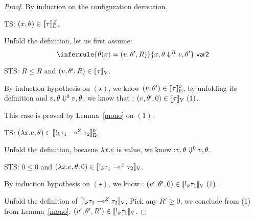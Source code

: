 \begin{proof}
  By induction on the configuration derivation.\\
   

  TS: $(x, \env) \in  \lre{}{\nnatA}{ \type}$.
  
  Unfold the definition, let us first assume: \[   \inferrule{  \env(x)  =  (\valr, \env',  \adapt)  }{x,
      \env  \bigstep{\adapt} \valr, \env' }~\textsf{var2}  \]
  
  STS: $R \leq R $  and $ (\valr, \env', R  ) \in \lrv{\type} $.

  By induction hypothesis on $(\star)$, we know $ (\valr, \env') \in \lre{}{0}{\type} $, by unfolding its definition and $ \valr, \env \bigstep{0} \valr, \env $,  we know that : $ (\valr, \env' ,0) \in \lrv{\type}~(1)$.

  This case is proved by Lemma~\ref{mono} on $(1)$.\\


   TS: $(\lambda x. \expr , \env) \in  \lre{}{0}{  \bang{\idx} \type_1\lto{\nnatA} \type_2 }$.
  
  Unfold the definition, becasue $\lambda x. \expr$ is value, we know :$ \valr, \env \bigstep{0} \valr, \env$.
  
  STS: $0 \leq 0 $  and $ (\lambda x.\expr, \env, 0  ) \in \lrv{ \bang{\idx} \type_1\lto{\nnatA} \type_2 } $.

  By induction hypothesis on $(\star)$,  we know : $ (\valr', \env' ,0) \in \lrv{\bang{k} \type_1} ~(1) $.

  Unfold the definition of $\lrv{ \bang{\idx} \type_1\lto{\nnatA} \type_2 }$, Pick any $R' \geq 0$, we conclude from (1) from Lemma~\ref{mono}: $  (\valr', \env' ,R') \in \lrv{\bang{k} \type_1} $.


\end{proof}
